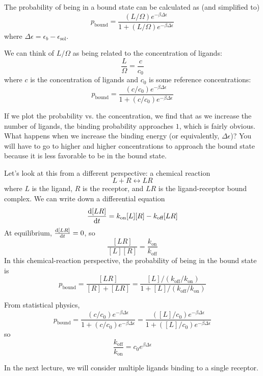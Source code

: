 \documentclass[a4paper,twoside,master.tex]{subfiles}
\begin{document}
The probability of being in a bound state can be calculated as (and simplified to)
\begin{equation}
    p_{\text{bound}} = \frac{(L/ \Omega)e^{- \beta \Delta \epsilon}}{1 + (L / \Omega)e^{- \beta \Delta \epsilon}}
\end{equation}
where $ \Delta \epsilon = \epsilon_b - \epsilon_{\text{sol}} $.

We can think of $ L / \Omega $ as being related to the concentration of ligands:
\begin{equation}
    \frac{L}{\Omega} = \frac{c}{c_0}
\end{equation}
where $ c $ is the concentration of ligands and $ c_0 $ is some reference concentrations:
\begin{equation}
    p_{\text{bound}} = \frac{(c/c_0)e^{- \beta \Delta \epsilon}}{1 + (c/c_0)e^{- \beta \Delta \epsilon}}
\end{equation}

If we plot the probability vs. the concentration, we find that as we increase the number of ligands, the binding probability approaches $ 1 $, which is fairly obvious. What happens when we increase the binding energy (or equivalently, $ \Delta \epsilon $)? You will have to go to higher and higher concentrations to approach the bound state because it is less favorable to be in the bound state.

Let's look at this from a different perspective: a chemical reaction
\begin{equation}
    L + R \leftrightarrow LR
\end{equation}
where $ L $ is the ligand, $ R $ is the receptor, and $ LR $ is the ligand-receptor bound complex. We can write down a differential equation
\begin{equation}
    \dv{[LR]}{t} = k_{\text{on}} [L][R] - k_{\text{off}} [LR]
\end{equation}
At equilibrium, $ \dv{[LR]}{t} = 0 $, so
\begin{equation}
    \frac{[LR]}{[L][R]} = \frac{k_{\text{on}}}{k_{\text{off}}}
\end{equation}
In this chemical-reaction perspective, the probability of being in the bound state is
\begin{equation}
    p_{\text{bound}} = \frac{[LR]}{[R] + [LR]} = \frac{[L]/(k_{\text{off}} / k_{\text{on}})}{1 + [L]/(k_{\text{off}} / k_{\text{on}})}
\end{equation}

From statistical physics,
\begin{equation}
    p_{\text{bound}} = \frac{(c/c_0)e^{- \beta \Delta \epsilon}}{1 + (c/c_0)e^{- \beta \Delta \epsilon}} = \frac{([L]/c_0)e^{- \beta \Delta \epsilon}}{1 + ([L]/c_0)e^{- \beta \Delta \epsilon}}
\end{equation}
so
\begin{equation}
    \frac{k_{\text{off}}}{k_{\text{on}}} = c_0 e^{\beta \Delta \epsilon}
\end{equation}

In the next lecture, we will consider multiple ligands binding to a single receptor.
\end{document}
